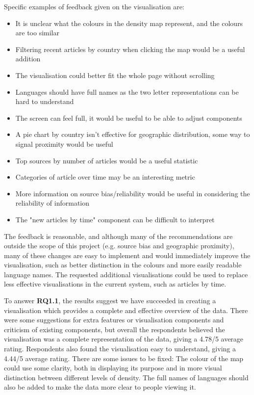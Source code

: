 \documentclass{l4proj}
\begin{document}
Specific examples of feedback given on the visualisation are:
\begin{itemize}
    \item It is unclear what the colours in the density map represent, and the colours are too similar
    \item Filtering recent articles by country when clicking the map would be a useful addition
    \item The visualisation could better fit the whole page without scrolling
    \item Languages should have full names as the two letter representations can be hard to understand
    \item The screen can feel full, it would be useful to be able to adjust components
    \item A pie chart by country isn't effective for geographic distribution, some way to signal proximity would be useful
    \item Top sources by number of articles would be a useful statistic
    \item Categories of article over time may be an interesting metric
    \item More information on source bias/reliability would be useful in considering the reliability of information
    \item The "new articles by time" component can be difficult to interpret
\end{itemize}

The feedback is reasonable, and although many of the recommendations are outside the scope of this project (e.g. source bias and geographic proximity), many of these changes are easy to implement and would immediately improve the visualisation, such as better distinction in the colours and more easily readable language names. The requested additional visualisations could be used to replace less effective visualisations in the current system, such as articles by time. \par
To answer \textbf{RQ1.1}, the results suggest we have succeeded in creating a visualisation which provides a complete and effective overview of the data. There were some suggestions for extra features or visualisation components and criticism of existing components, but overall the respondents believed the visualisation was a complete representation of the data, giving a 4.78/5 average rating. Respondents also found the visualisation easy to understand, giving a 4.44/5 average rating. There are some issues to be fixed: The colour of the map could use some clarity, both in displaying its purpose and in more visual distinction between different levels of density. The full names of languages should also be added to make the data more clear to people viewing it.
\end{document}

